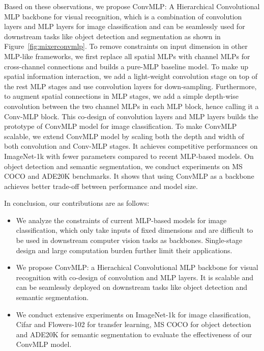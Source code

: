 \documentclass[final]{cvpr}
\begin{document}
Based on these observations, we propose ConvMLP: A Hierarchical Convolutional MLP backbone for visual recognition, which is a combination of convolution layers and MLP layers for image classification and can be seamlessly used for downstream tasks like object detection and segmentation as shown in Figure~\ref{fig:mixerconvmlp}. To remove constraints on input dimension in other MLP-like frameworks, we first replace all spatial MLPs with channel MLPs for cross-channel connections and builds a pure-MLP baseline model. To make up spatial information interaction, we add a light-weight convolution stage on top of the rest MLP stages and use convolution layers for down-sampling. Furthermore, to augment spatial connections in MLP stages, we add a simple  depth-wise convolution between the two channel MLPs in each MLP block, hence calling it a Conv-MLP block. This co-design of convolution layers and MLP layers builds the prototype of ConvMLP model for image classification. To make ConvMLP scalable, we extend ConvMLP model by scaling both the depth and width of both convolution and Conv-MLP stages. It achieves competitive performances on ImageNet-1k with fewer parameters compared to recent MLP-based models. On object detection and semantic segmentation, we conduct experiments on MS COCO and ADE20K benchmarks. It shows that using ConvMLP as a backbone achieves better trade-off between performance and model size.

In conclusion, our contributions are as follows:
\begin{itemize}
\item We analyze the constraints of current MLP-based models for image classification, which only take inputs of fixed dimensions and are difficult to be used in downstream computer vision tasks as backbones. Single-stage design and large computation burden further limit their applications.

\item We propose ConvMLP: a Hierachical Convolutional MLP backbone for visual recognition with co-design of convolution and MLP layers. It is scalable and can be seamlessly deployed on downstream tasks like object detection and semantic segmentation. 

\item We conduct extensive experiments on ImageNet-1k for image classification, Cifar and Flowers-102 for transfer learning, MS COCO for object detection and ADE20K for semantic segmentation to evaluate the effectiveness of our ConvMLP model.

\end{itemize}
\end{document}
